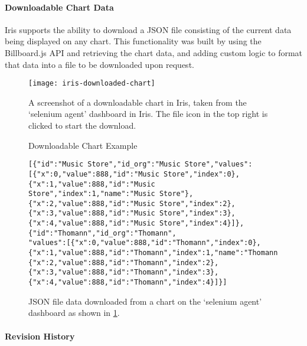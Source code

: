 \documentclass[12pt,a4paper,titlepage]{report}
\begin{document}
\paragraph{Downloadable Chart Data}

Iris supports the ability to download a JSON file consisting of the current data being displayed on any chart. This functionality was built by using the Billboard.js API and retrieving the chart data, and adding custom logic to format that data into a file to be downloaded upon request.
\begin{figure}[H]
\begin{tcolorbox}
\begin{center}
\texttt{[image: iris-downloaded-chart]}
\end{center}
A screenshot of a downloadable chart in Iris, taken from the `selenium agent' dashboard in Iris. The file icon in the top right is clicked to start the download.
\end{tcolorbox}
\caption{Downloadable Chart Example}
\label{fig:downloaded:chart}
\end{figure}

\begin{figure}[H]
\begin{tcolorbox}
\begin{verbatim}
[{"id":"Music Store","id_org":"Music Store","values":[{"x":0,"value":888,"id":"Music Store","index":0},{"x":1,"value":888,"id":"Music Store","index":1,"name":"Music Store"},{"x":2,"value":888,"id":"Music Store","index":2},{"x":3,"value":888,"id":"Music Store","index":3},{"x":4,"value":888,"id":"Music Store","index":4}]},{"id":"Thomann","id_org":"Thomann",
"values":[{"x":0,"value":888,"id":"Thomann","index":0},
{"x":1,"value":888,"id":"Thomann","index":1,"name":"Thomann"},
{"x":2,"value":888,"id":"Thomann","index":2},
{"x":3,"value":888,"id":"Thomann","index":3},
{"x":4,"value":888,"id":"Thomann","index":4}]}]
\end{verbatim}
\end{tcolorbox}
\caption{JSON file data downloaded from a chart on the  `selenium agent' dashboard as shown in \cref{fig:downloaded:chart}.}
\end{figure}

\paragraph{Revision History}
\end{document}
